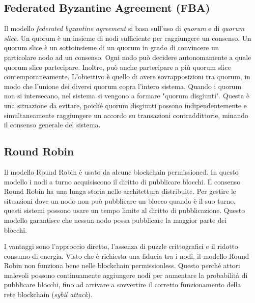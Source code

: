 \subsection{Federated Byzantine Agreement (FBA)}
\label{intro:fba}
Il modello \textit{federated byzantine agreement} si basa sull'uso di \textit{quorum}
e di \textit{quorum slice}.
Un quorum è un insieme di nodi sufficiente per raggiungere un consenso.
Un quorum slice è
un sottoinsieme di un quorum in grado di convincere un particolare nodo ad un consenso.
Ogni nodo può decidere autonomamente a quale quorum slice partecipare. Inoltre, può anche partecipare a
più quorum slice contemporaneamente.
L'obiettivo è quello di avere sovrapposizioni tra quorum, in modo che l'unione dei diversi quorum
copra l'intero sistema. Quando i quorum non si intersecano, nel sistema si vengono a formare
"quorum disgiunti". Questa è una situazione da evitare, poiché quorum disgiunti
possono indipendentemente e simultaneamente raggiungere un accordo su transazioni contraddittorie,
minando il consenso generale del sistema.

\subsection{Round Robin}
Il modello Round Robin è usato da alcune blockchain permissioned.
In questo modello i nodi a turno acquisiscono il diritto di pubblicare blocchi. Il consenso
Round Robin ha una lunga storia nelle architettura distribuite. Per gestire le situazioni
dove un nodo non può pubblicare un blocco quando è il suo turno, questi sistemi possono
usare un tempo limite al diritto di pubblicazione. Questo modello garantisce che nessun nodo possa
pubblicare la maggior parte dei blocchi.

I vantaggi sono l'approccio diretto, l'assenza di puzzle crittografici e il ridotto consumo di energia.
Visto che è richiesta una fiducia tra i nodi, il modello Round Robin non funziona bene
nelle blockchain permissionless. Questo perché attori malevoli possono continuamente aggiungere
nodi per aumentare la probabilità di pubblicare blocchi, fino ad arrivare a
sovvertire il corretto funzionamento della rete blockchain (\textit{sybil attack}).

